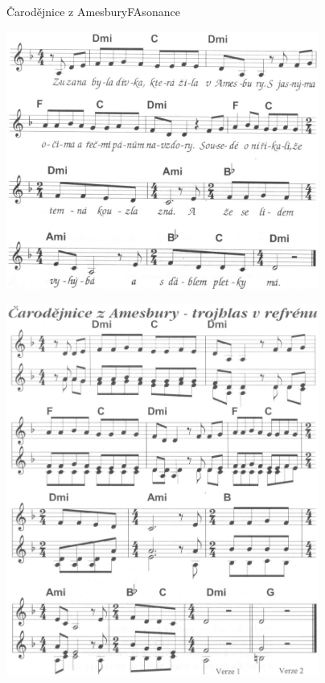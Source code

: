 \setcounter{page}{12}
\begin{song}{Čarodějnice z Amesbury}{F}{Asonance}
\begin{center}
\includegraphics[width=0.77\textwidth]{noty/a_carodejnice1} 

\;

\includegraphics[width=0.77\textwidth]{noty/a_carodejnice2} 
 
\end{center} 
\end{song} \pagebreak
